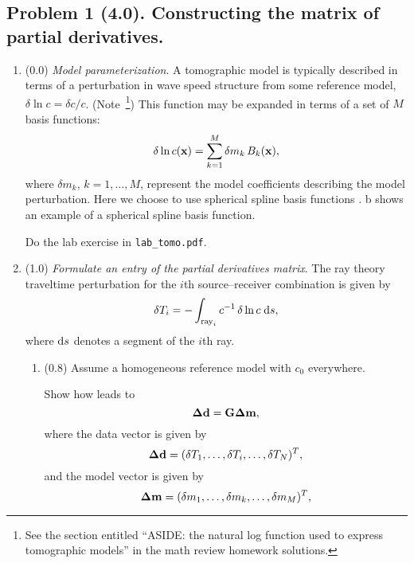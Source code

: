 \documentclass[11pt,titlepage,fleqn]{article}
\begin{document}

\subsection*{Problem 1 (4.0). Constructing the matrix of partial derivatives.}

\begin{enumerate}
\item (0.0) {\em Model parameterization}. A tomographic model is typically described in terms of a perturbation in wave speed structure from some reference model, \ie $\delta\ln c = \delta c/c$.
(Note~\footnote{See the section entitled ``ASIDE: the natural log function used to express tomographic models'' in the math review homework solutions.})
This function may be expanded in terms of a set of $M$ basis functions:
%
\begin{equation}
\delta\ln c(\mbox{${\bf x}$})=\sum_{k=1}^M \delta m_k\,B_k(\mbox{${\bf x}$}),
\label{dlnv}
\end{equation}
%
where $\delta m_k$, $k=1,\ldots,M$, represent the model coefficients describing the model perturbation.  Here we choose to use spherical spline basis functions \citep{WangDahlen1995spline,Wang1998}.
b shows an example of a spherical spline basis function.

Do the lab exercise in \verb+lab_tomo.pdf+.


\item (1.0) {\em Formulate an entry of the partial derivatives matrix}.
%
The ray theory traveltime perturbation for the $i$th source--receiver combination is given by
%
\begin{equation}
\delta T_i = -\int_{\mathrm{ray}_i} c^{-1}\,\delta\ln c\;\mathrm{d} s,
\label{ray_tomography}
\end{equation}
%
where $\mathrm{d} s$ denotes a segment of the $i$th ray.

\begin{enumerate}
\item (0.8) Assume a homogeneous reference model with $c_0$ everywhere.

Show how  leads to 
%
\begin{equation}
\mbox{\boldmath $\bf \Delta$}\mbox{${\bf d}$} = \mbox{${\bf G}$}\mbox{\boldmath $\bf \Delta$}\mbox{${\bf m}$},
\end{equation}
%
where the data vector is given by
%
\begin{equation}
\mbox{\boldmath $\bf \Delta$}\mbox{${\bf d}$} = (\delta T_1,\ldots,\delta T_i,\ldots,\delta T_N)^T,
\label{d}
\end{equation}
%
and the model vector is given by
%
\begin{equation}
\mbox{\boldmath $\bf \Delta$}\mbox{${\bf m}$} = (\delta m_1,\ldots,\delta m_k,\ldots,\delta m_M)^T,
\label{m}
\end{equation}


\end{enumerate}
\end{enumerate}
\end{document}
